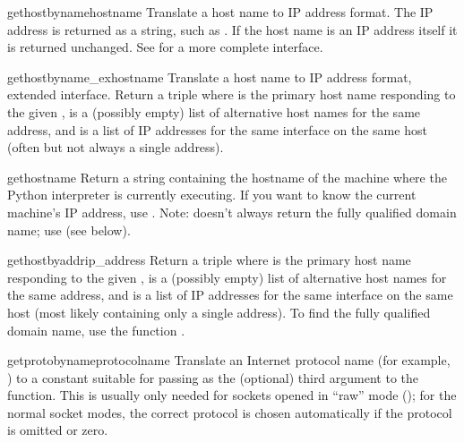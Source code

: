 \begin{funcdesc}{gethostbyname}{hostname}
Translate a host name to IP address format.  The IP address is
returned as a string, such as .  If the host name
is an IP address itself it is returned unchanged.  See
 for a more complete interface.
\end{funcdesc}

\begin{funcdesc}{gethostbyname_ex}{hostname}
Translate a host name to IP address format, extended interface.
Return a triple  where
 is the primary host name responding to the given
,  is a (possibly empty) list of
alternative host names for the same address, and  is
a list of IP addresses for the same interface on the same
host (often but not always a single address).
\end{funcdesc}

\begin{funcdesc}{gethostname}{}
Return a string containing the hostname of the machine where 
the Python interpreter is currently executing.  If you want to know the
current machine's IP address, use .
Note:  doesn't always return the fully qualified
domain name; use 
(see below).
\end{funcdesc}

\begin{funcdesc}{gethostbyaddr}{ip_address}
Return a triple  where  is the primary host name
responding to the given ,  is a
(possibly empty) list of alternative host names for the same address,
and  is a list of IP addresses for the same interface
on the same host (most likely containing only a single address).
To find the fully qualified domain name, use the function
.
\end{funcdesc}

\begin{funcdesc}{getprotobyname}{protocolname}
Translate an Internet protocol name (for example, ) to a constant
suitable for passing as the (optional) third argument to the
 function.  This is usually only needed for sockets
opened in ``raw'' mode (); for the normal socket
modes, the correct protocol is chosen automatically if the protocol is
omitted or zero.
\end{funcdesc}

